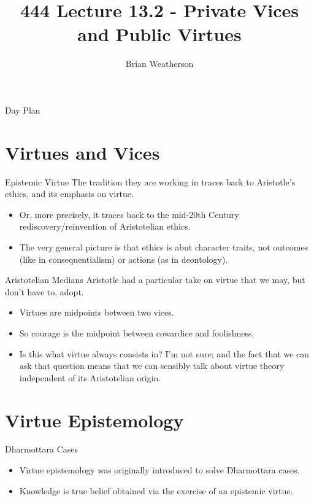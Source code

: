 \documentclass[
  ignorenonframetext,
]{beamer}
\title{444 Lecture 13.2 - Private Vices and Public Virtues}
\author{Brian Weatherson}
\date{}
\providecommand{\tightlist}{%
  \setlength{\itemsep}{0pt}\setlength{\parskip}{0pt}}
\begin{document}
\frame{\titlepage}

\begin{frame}{Day Plan}
\protect\hypertarget{day-plan}{}
\tableofcontents
\end{frame}

\hypertarget{virtues-and-vices}{%
\section{Virtues and Vices}\label{virtues-and-vices}}

\begin{frame}{Epistemic Virtue}
\protect\hypertarget{epistemic-virtue}{}
The tradition they are working in traces back to Aristotle's ethics, and
its emphasis on virtue.

\begin{itemize}
\tightlist
\item
  Or, more precisely, it traces back to the mid-20th Century
  rediscovery/reinvention of Aristotelian ethics.
\item
  The very general picture is that ethics is abut character traits, not
  outcomes (like in consequentialism) or actions (as in deontology).
\end{itemize}
\end{frame}

\begin{frame}{Aristotelian Medians}
\protect\hypertarget{aristotelian-medians}{}
Aristotle had a particular take on virtue that we may, but don't have
to, adopt.

\begin{itemize}
\tightlist
\item
  Virtues are midpoints between two vices.
\item
  So courage is the midpoint between cowardice and foolishness.
\item
  Is this what virtue always consists in? I'm not sure; and the fact
  that we can ask that question means that we can sensibly talk about
  virtue theory independent of its Aristotelian origin.
\end{itemize}
\end{frame}

\hypertarget{virtue-epistemology}{%
\section{Virtue Epistemology}\label{virtue-epistemology}}

\begin{frame}{Dharmottara Cases}
\protect\hypertarget{dharmottara-cases}{}
\begin{itemize}
\tightlist
\item
  Virtue epistemology was originally introduced to solve Dharmottara
  cases.
\item
  Knowledge is true belief obtained via the exercise of an epistemic
  virtue.
\end{itemize}
\end{frame}
\end{document}
